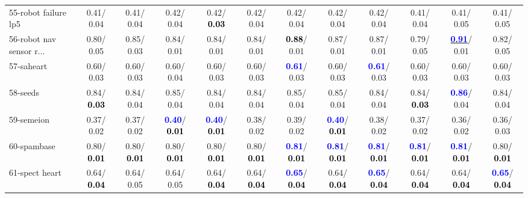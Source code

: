 \begin{table}[h]
\begin{center}
{\begin{tabular}{lc|c|c|c|c|c|c|c|c|c|c}
55-robot failure lp5 &   0.41/  0.04 &   0.41/  0.04 &   0.42/  0.04 &   0.42/\textcolor{black}{\textbf{  0.03}} &   0.42/  0.04 &   0.42/  0.04 &   0.42/  0.04 &   0.42/  0.04 &   0.41/  0.04 &   0.41/  0.05 &   0.41/  0.05 \\
56-robot nav sensor r... &   0.80/  0.05 &   0.85/  0.03 &   0.84/  0.01 &   0.84/  0.01 &   0.84/  0.01 & \textcolor{black}{\textbf{  0.88}}/  0.01 &   0.87/  0.01 &   0.87/  0.01 &   0.79/  0.05 & \underline{\textcolor{blue}{\textbf{  0.91}}}/  0.01 &   0.82/  0.05 \\
57-saheart &   0.60/  0.03 &   0.60/  0.03 &   0.60/  0.04 &   0.60/  0.03 &   0.60/  0.03 & \textcolor{blue}{\textbf{  0.61}}/  0.03 &   0.60/  0.03 & \textcolor{blue}{\textbf{  0.61}}/  0.03 &   0.60/  0.03 &   0.60/  0.03 &   0.60/  0.03 \\
58-seeds &   0.84/\textcolor{black}{\textbf{  0.03}} &   0.84/  0.04 &   0.85/  0.04 &   0.84/  0.04 &   0.84/  0.04 &   0.85/  0.04 &   0.85/  0.04 &   0.84/  0.04 &   0.84/\textcolor{black}{\textbf{  0.03}} & \textcolor{blue}{\textbf{  0.86}}/  0.04 &   0.84/  0.04 \\
59-semeion &   0.37/  0.02 &   0.37/  0.02 & \textcolor{blue}{\textbf{  0.40}}/\textcolor{black}{\textbf{  0.01}} & \textcolor{blue}{\textbf{  0.40}}/\textcolor{black}{\textbf{  0.01}} &   0.38/  0.02 &   0.39/  0.02 & \textcolor{blue}{\textbf{  0.40}}/\textcolor{black}{\textbf{  0.01}} &   0.38/  0.02 &   0.37/  0.02 &   0.36/  0.02 &   0.36/  0.03 \\
60-spambase &   0.80/\textcolor{black}{\textbf{  0.01}} &   0.80/\textcolor{black}{\textbf{  0.01}} &   0.80/\textcolor{black}{\textbf{  0.01}} &   0.80/\textcolor{black}{\textbf{  0.01}} &   0.80/\textcolor{black}{\textbf{  0.01}} & \textcolor{blue}{\textbf{  0.81}}/\textcolor{black}{\textbf{  0.01}} & \textcolor{blue}{\textbf{  0.81}}/\textcolor{black}{\textbf{  0.01}} & \textcolor{blue}{\textbf{  0.81}}/\textcolor{black}{\textbf{  0.01}} & \textcolor{blue}{\textbf{  0.81}}/\textcolor{black}{\textbf{  0.01}} & \textcolor{blue}{\textbf{  0.81}}/\textcolor{black}{\textbf{  0.01}} &   0.80/\textcolor{black}{\textbf{  0.01}} \\ \hline
61-spect heart &   0.64/\textcolor{black}{\textbf{  0.04}} &   0.64/  0.05 &   0.64/  0.05 &   0.64/\textcolor{black}{\textbf{  0.04}} &   0.64/\textcolor{black}{\textbf{  0.04}} & \textcolor{blue}{\textbf{  0.65}}/\textcolor{black}{\textbf{  0.04}} &   0.64/\textcolor{black}{\textbf{  0.04}} & \textcolor{blue}{\textbf{  0.65}}/\textcolor{black}{\textbf{  0.04}} &   0.64/\textcolor{black}{\textbf{  0.04}} &   0.64/\textcolor{black}{\textbf{  0.04}} & \textcolor{blue}{\textbf{  0.65}}/\textcolor{black}{\textbf{  0.04}} \\

\end{tabular}}
\end{center}
\end{table}
